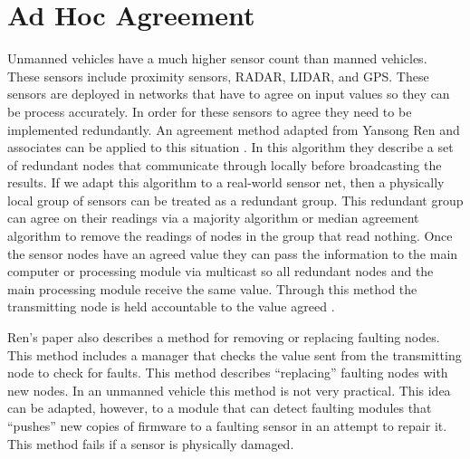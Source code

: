 \documentclass[twoside, conference]{IEEEtran}%
\begin{document}
\section{Ad Hoc Agreement}\label{sec:adhoc-agreement}
Unmanned vehicles have a much higher sensor count than manned vehicles. These sensors include proximity sensors, RADAR, LIDAR, and GPS. These sensors are deployed in networks that have to agree on input values so they can be process accurately. In order for these sensors to agree they need to be implemented redundantly. An agreement method adapted from Yansong Ren and associates can be applied to this situation \cite{Ren2001}. In this algorithm they describe a set of redundant nodes that communicate through locally before broadcasting the results. If we adapt this algorithm to a real-world sensor net, then a physically local group of sensors can be treated as a redundant group. This redundant group can agree on their readings via a majority algorithm or median agreement algorithm to remove the readings of nodes in the group that read nothing. Once the sensor nodes have an agreed value they can pass the information to the main computer or processing module via multicast so all redundant nodes and the main processing module receive the same value. Through this method the transmitting node is held accountable to the value agreed \cite{Ren2001}.

Ren's paper also describes a method for removing or replacing faulting nodes. This method includes a manager that checks the value sent from the transmitting node to check for faults. This method describes ``replacing'' faulting nodes with new nodes. In an unmanned vehicle this method is not very practical. This idea can be adapted, however, to a module that can detect faulting modules that ``pushes'' new copies of firmware to a faulting sensor in an attempt to repair it. This method fails if a sensor is physically damaged.\cite{Ren2001}
\end{document}

